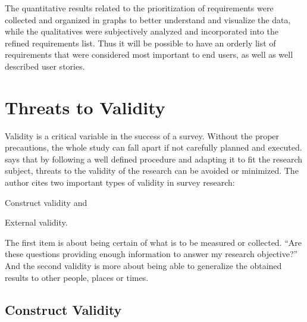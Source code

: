 The quantitative results related to the prioritization of requirements were collected and organized in graphs to better understand and visualize the data, while the qualitatives were subjectively analyzed and incorporated into the refined requirements list. Thus it will be possible to have an orderly list of requirements that were considered most important to end users, as well as well described user stories.

\section{Threats to Validity}\label{sec:survey-validity}

Validity is a critical variable in the success of a survey. Without the proper precautions, the whole study can fall apart if not carefully planned and executed.  says that by following a well defined procedure and adapting it to fit the research subject, threats to the validity of the research can be avoided or minimized. The author cites two important types of validity in survey research:
\begin{inparaenum}[(1)]
  \item Construct validity and
  \item External validity.
\end{inparaenum}

The first item is about being certain of what is to be measured or collected. ``Are these questions providing enough information to answer my research objective?'' And the second validity is more about being able to generalize the obtained results to other people, places or times.

\subsection{Construct Validity}\label{sec:survey-construct-validity}

